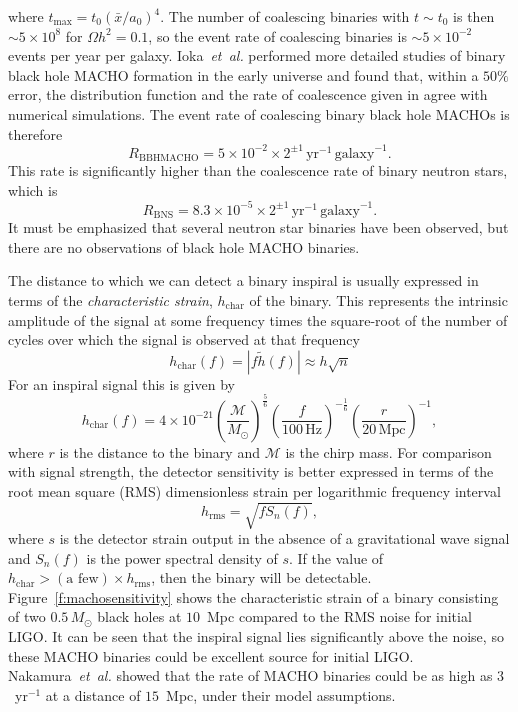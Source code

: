 where $t_\mathrm{max} = t_0(\bar{x}/a_0)^4$. The number of coalescing binaries
with $t \sim t_0$ is then $\sim 5 \times 10^{8}$ for $\Omega h^2 = 0.1$, so
the event rate of coalescing binaries is $\sim 5 \times 10^{-2}$ events per
year per galaxy. Ioka~\emph{et~al.} performed more detailed studies of binary
black hole MACHO formation in the early universe\cite{Ioka:1998nz} and found
that, within a $50\%$ error, the distribution function and the rate of
coalescence given in \cite{Nakamura:1997sm} agree with numerical simulations.
The event rate of coalescing binary black hole MACHOs is therefore
\begin{equation}
R_\mathrm{BBHMACHO} = 5\times 10^{-2}\times 2^{\pm
1}\,\mathrm{yr}^{-1}\,\mathrm{galaxy}^{-1}.
\end{equation}
This rate is significantly higher than the coalescence rate of
binary neutron stars, which is\cite{Kalogera:2004tn}
\begin{equation}
R_\mathrm{BNS} = 8.3\times 10^{-5}\times 2^{\pm
1}\,\mathrm{yr}^{-1}\,\mathrm{galaxy}^{-1}.
\end{equation}
It must be emphasized that several neutron star binaries have been
observed, but there are no observations of black hole MACHO binaries.

The distance to which we can detect a binary inspiral is usually expressed in
terms of the \emph{characteristic strain}, $h_\mathrm{char}$ of the binary. This
represents the intrinsic amplitude of the signal at some frequency times the
square-root of the number of cycles over which the signal is observed at that
frequency
\begin{equation}
h_\mathrm{char}(f) = |f \tilde{h}(f)| \approx h \sqrt{n}
\end{equation}
 For an inspiral signal this is given by\cite{Thorne:1982cv}
\begin{equation}
h_\mathrm{char}(f)  =  4 \times 10^{-21} \left(\frac{\mathcal{M}}{{M_\odot}}\right)^\frac{5}{6}
\left(\frac{f}{100\,\mathrm{Hz}}\right)^{-\frac{1}{6}} \left(\frac{r}{20\,
\mathrm{Mpc}}\right)^{-1},
\end{equation}
where $r$ is the distance to the binary and $\mathcal{M}$ is the chirp mass.
For comparison with signal strength, the detector sensitivity is better
expressed in terms of the root mean square (RMS) dimensionless strain per
logarithmic frequency interval
\begin{equation}
h_\mathrm{rms} = \sqrt{f S_n(f)},
\end{equation}
where $s$ is the detector strain output in the absence of a gravitational wave
signal and $S_n(f)$ is the power spectral density of $s$. If the value of
$h_\mathrm{char}
> \left(\textrm{a few}\right) \times h_\mathrm{rms}$, then the binary will be
detectable. Figure~\ref{f:machosensitivity} shows the characteristic strain of
a binary consisting of two $0.5\,M_\odot$ black holes at $10$~Mpc compared to
the RMS noise for initial LIGO. It can be seen that the inspiral signal lies
significantly above the noise, so these MACHO binaries could be excellent
source for initial LIGO. Nakamura~\emph{et~al.} showed that the rate of MACHO
binaries could be as high as $3$~yr$^{-1}$ at a distance of
$15$~Mpc\cite{Nakamura:1997sm}, under their model assumptions.

